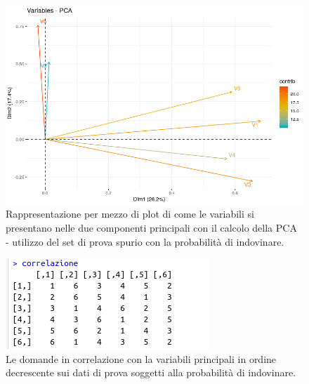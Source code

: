 \begin{figure}[H]
\centering
	\includegraphics[width=0.80\linewidth]{../../PCA/plot/PCA-valorindovinati.png}
	\caption{Rappresentazione per mezzo di plot di come le variabili si presentano nelle due componenti principali con il calcolo della PCA - utilizzo del set di prova spurio con la probabilità di indovinare.}
	\label{Rappresentazione per mezzo di plot di come le variabili si presentano nelle due componenti principali con il calcolo della PCA - utilizzo del set di prova spurio con la probabilita di indovinare.}
\end{figure}


\begin{figure}[H]
\centering
	\includegraphics[width=0.60\linewidth]{../../PCA/plot/correlazione_with-probability.png}
	\caption{Le domande in correlazione con la variabili principali in ordine decrescente sui dati di prova soggetti alla probabilità di indovinare.}
	\label{Le domande in correlazione con la variabili principali in ordine decrescente sui dati di prova soggetti alla probabilita di indovinare.}
\end{figure}


